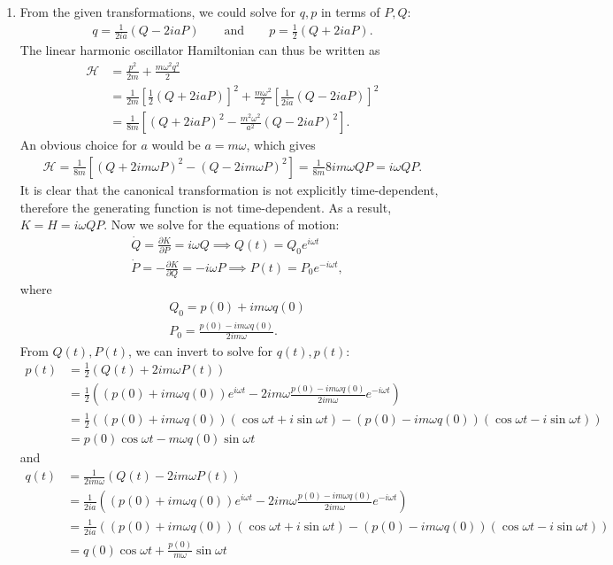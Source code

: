 \documentclass{article}
\theoremstyle{definition}
\newcommand{\p}{\partial}
\newcommand{\ham}{\mathcal{H}}
\newcommand{\f}[2]{\frac{#1}{#2}}
\newcommand{\lp}{\left(}
\newcommand{\rp}{\right)}
\newcommand{\lb}{\left[}
\newcommand{\rb}{\right]}
\begin{document}
\begin{enumerate}[label=(\alph*)]
	\item From the given transformations, we could solve for $q,p$ in terms of $P,Q$:
	\begin{align*}
	q = \f{1}{2ia}(Q- 2ia P)\quad\quad\text{and}\quad\quad p= \f{1}{2}(Q + 2ia P).
	\end{align*}
	The linear harmonic oscillator Hamiltonian can thus be written as 
	\begin{align*}
	\ham &= \f{p^2}{2m} + \f{m\omega^2q^2}{2}\\ 
	&= \f{1}{2m}\lb \f{1}{2}(Q + 2ia P)  \rb^2 + \f{m\omega^2}{2}\lb \f{1}{2ia}(Q- 2ia P) \rb^2\\
	&=  \f{1}{8m}\lb (Q + 2iaP)^2 - \f{m^2\omega^2}{a^2}( Q - 2iaP)^2 \rb.
	\end{align*}
	An obvious choice for $a$ would be $\boxed{a = m\omega}$, which gives
	\begin{align*}
	\ham = \f{1}{8m} \lb (Q + 2im\omega P)^2 - ( Q - 2i m\omega P)^2 \rb = \f{1}{8m}8im\omega QP = i\omega QP.  
	\end{align*} 
	It is clear that the canonical transformation is not explicitly time-dependent, therefore the generating function is not time-dependent. As a result, $\boxed{K = H = i\omega QP}$. Now we solve for the equations of motion: 
	\begin{align*}
	&\dot Q = \f{\p K }{\p P} = i\omega Q \implies Q(t) = Q_0 e^{i\omega t}\\
	&\dot P = -\f{\p K}{\p Q} = -i\omega P \implies P(t) = P_0 e^{-i\omega t},
	\end{align*}
	where
	\begin{align*}
	&Q_0 = p(0) + im \omega q(0) \\
	&P_0 = \f{p(0) - im\omega q(0)}{2im\omega}.
	\end{align*}
	From $Q(t), P(t)$, we can invert to solve for $q(t),p(t)$:
	\begin{align*}
	\boxed{p(t)} &= \f{1}{2}\lp Q(t) + 2im\omega P(t) \rp\\ 
	&= \f{1}{2}\lp (p(0) + im \omega q(0)) e^{i\omega t} - 2im\omega \f{p(0) - im\omega q(0)}{2im\omega} e^{-i\omega t}    \rp\\
	&= \f{1}{2}\lp (p(0) + im \omega q(0))(\cos \omega t + i\sin\omega t) -  (p(0) - im\omega q(0)) (\cos\omega t - i\sin\omega t )   \rp\\
	&= \boxed{p(0)\cos\omega t - m\omega q(0)\sin\omega t}
	\end{align*}
	and
	\begin{align*}
	\boxed{q(t)} &= \f{1}{2im\omega}(Q(t) - 2im\omega P(t)) \\
	&= \f{1}{2ia}((p(0) + im \omega q(0))e^{i\omega t}- 2im\omega \f{p(0) - im\omega q(0)}{2im\omega }e^{-i\omega t})\\
	&= \f{1}{2ia}\lp(p(0) + im \omega q(0))(\cos \omega t + i\sin\omega t) - (p(0) - im\omega q(0))(\cos \omega t - i\sin\omega t) \rp\\
	&= \boxed{q(0)\cos\omega t + \f{p(0)}{m\omega} \sin\omega t}
	\end{align*}

\end{enumerate}
\end{document}
